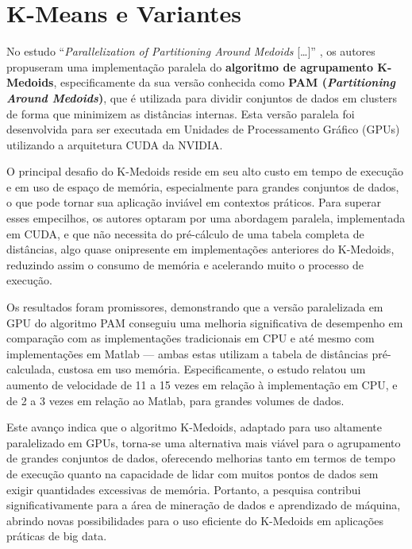 \documentclass[12pt, %
openright, 
oneside, %
a4paper,    %
brazil]{facom-ufu-abntex2}
\begin{document}

\section{K-Means e Variantes}

No estudo \enquote{\textit{Parallelization of Partitioning Around Medoids} [\dots]} \cite{pamKMedoids2020}, os autores propuseram uma implementação paralela do \textbf{algoritmo de agrupamento K-Medoids}, especificamente da sua versão conhecida como \textbf{PAM (\textit{Partitioning Around Medoids})}, que é utilizada para dividir conjuntos de dados em clusters de forma que minimizem as distâncias internas. Esta versão paralela foi desenvolvida para ser executada em Unidades de Processamento Gráfico (GPUs) utilizando a arquitetura CUDA da NVIDIA.

O principal desafio do K-Medoids reside em seu alto custo em tempo de execução e em uso de espaço de memória, especialmente para grandes conjuntos de dados, o que pode tornar sua aplicação inviável em contextos práticos. Para superar esses empecilhos, os autores optaram por uma abordagem paralela, implementada em CUDA, e que não necessita do pré-cálculo de uma tabela completa de distâncias, algo quase onipresente em implementações anteriores do K-Medoids, reduzindo assim o consumo de memória e acelerando muito o processo de execução.

Os resultados foram promissores, demonstrando que a versão paralelizada em GPU do algoritmo PAM conseguiu uma melhoria significativa de desempenho em comparação com as implementações tradicionais em CPU e até mesmo com implementações em Matlab --- ambas estas utilizam a tabela de distâncias pré-calculada, custosa em uso memória. Especificamente, o estudo relatou um aumento de velocidade de 11 a 15 vezes em relação à implementação em CPU, e de 2 a 3 vezes em relação ao Matlab, para grandes volumes de dados.

Este avanço indica que o algoritmo K-Medoids, adaptado para uso altamente paralelizado em GPUs, torna-se uma alternativa mais viável para o agrupamento de grandes conjuntos de dados, oferecendo melhorias tanto em termos de tempo de execução quanto na capacidade de lidar com muitos pontos de dados sem exigir quantidades excessivas de memória. Portanto, a pesquisa contribui significativamente para a área de mineração de dados e aprendizado de máquina, abrindo novas possibilidades para o uso eficiente do K-Medoids em aplicações práticas de big data.
\end{document}
